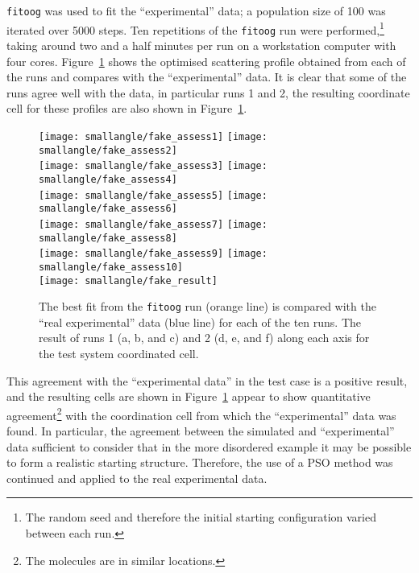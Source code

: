 \texttt{fitoog} was used to fit the ``experimental'' data; a population size of 100 was iterated over 5000 steps.
Ten repetitions of the \texttt{fitoog} run were performed,\footnote{The random seed and therefore the initial starting configuration varied between each run.} taking around two and a half minutes per run on a workstation computer with four cores.
Figure~\ref{fig:test_assess} shows the optimised scattering profile obtained from each of the runs and compares with the ``experimental'' data.
It is clear that some of the runs agree well with the data, in particular runs \num{1} and \num{2}, the resulting coordinate cell for these profiles are also shown in Figure~\ref{fig:test_assess}.
%
\begin{figure}
    \centering
    \texttt{[image: smallangle/fake\_assess1]}
    \texttt{[image: smallangle/fake\_assess2]} \\
    \texttt{[image: smallangle/fake\_assess3]}
    \texttt{[image: smallangle/fake\_assess4]} \\
    \texttt{[image: smallangle/fake\_assess5]}
    \texttt{[image: smallangle/fake\_assess6]} \\
    \texttt{[image: smallangle/fake\_assess7]}
    \texttt{[image: smallangle/fake\_assess8]} \\
    \texttt{[image: smallangle/fake\_assess9]}
    \texttt{[image: smallangle/fake\_assess10]} \\
    \texttt{[image: smallangle/fake\_result]}
    \caption{The best fit from the \texttt{fitoog} run (orange line) is compared with the ``real experimental'' data (blue line) for each of the ten runs. The result of runs 1 (a, b, and c) and 2 (d, e, and f) along each axis for the test system coordinated cell.}
    \label{fig:test_assess}
\end{figure}
%

This agreement with the ``experimental data'' in the test case is a positive result, and the resulting cells are shown in Figure~\ref{fig:test_assess} appear to show quantitative agreement\footnote{The molecules are in similar locations.} with the coordination cell from which the ``experimental'' data was found.
In particular, the agreement between the simulated and ``experimental'' data sufficient to consider that in the more disordered example it may be possible to form a realistic starting structure.
Therefore, the use of a PSO method was continued and applied to the real experimental data.

